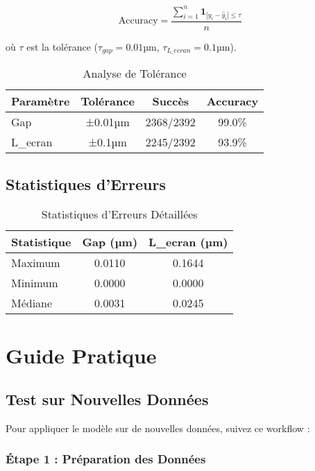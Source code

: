 \documentclass[10pt,twocolumn]{article}
\begin{document}
\begin{equation}
\text{Accuracy} = \frac{\sum_{i=1}^{n} \mathbf{1}_{|y_i - \hat{y}_i| \leq \tau}}{n}
\end{equation}

où $\tau$ est la tolérance ($\tau_{gap} = 0.01$µm, $\tau_{L\_ecran} = 0.1$µm).

\begin{table}[H]
\centering
\caption{Analyse de Tolérance}
\begin{tabular}{lccc}
\toprule
\rowcolor{lightblue!20}
\textbf{Paramètre} & \textbf{Tolérance} & \textbf{Succès} & \textbf{Accuracy} \\
\midrule
Gap & ±0.01µm & 2368/2392 & 99.0\% \\
L\_ecran & ±0.1µm & 2245/2392 & 93.9\% \\
\bottomrule
\end{tabular}
\end{table}

\subsection{Statistiques d'Erreurs}

\begin{table}[H]
\centering
\caption{Statistiques d'Erreurs Détaillées}
\begin{tabular}{lcc}
\toprule
\rowcolor{lightblue!20}
\textbf{Statistique} & \textbf{Gap (µm)} & \textbf{L\_ecran (µm)} \\
\midrule
Maximum & 0.0110 & 0.1644 \\
Minimum & 0.0000 & 0.0000 \\
Médiane & 0.0031 & 0.0245 \\
\bottomrule
\end{tabular}
\end{table}

\section{Guide Pratique}

\subsection{Test sur Nouvelles Données}

Pour appliquer le modèle sur de nouvelles données, suivez ce workflow :

\subsubsection{Étape 1 : Préparation des Données}
\end{document}
